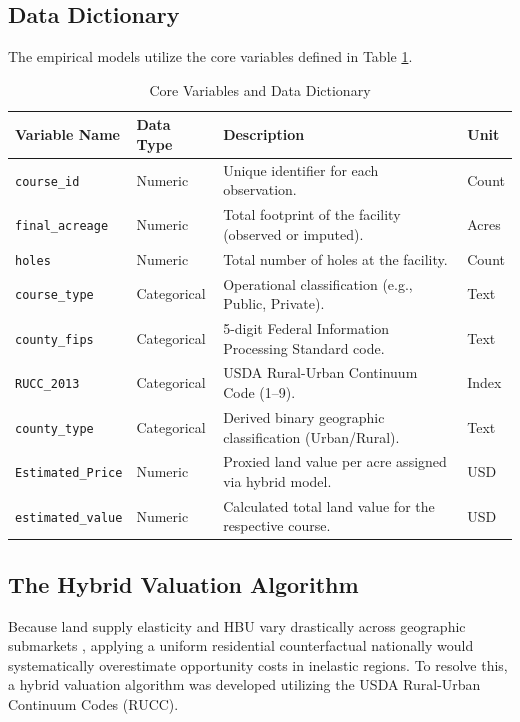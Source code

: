 \documentclass[10pt, letterpaper]{article}
\begin{document}
\subsection{Data Dictionary}
The empirical models utilize the core variables defined in Table \ref{tab:data_dict}.

\begin{table}[h!]
\centering
\caption{Core Variables and Data Dictionary}
\label{tab:data_dict}
\renewcommand{\arraystretch}{1.2}
\begin{tabular}{p{3.5cm} p{2cm} p{7cm} p{2.5cm}}
\hline
\textbf{Variable Name} & \textbf{Data Type} & \textbf{Description} & \textbf{Unit} \\
\hline
\texttt{course\_id} & Numeric & Unique identifier for each observation. & Count \\
\texttt{final\_acreage} & Numeric & Total footprint of the facility (observed or imputed). & Acres \\
\texttt{holes} & Numeric & Total number of holes at the facility. & Count \\
\texttt{course\_type} & Categorical & Operational classification (e.g., Public, Private). & Text \\
\texttt{county\_fips} & Categorical & 5-digit Federal Information Processing Standard code. & Text \\
\texttt{RUCC\_2013} & Categorical & USDA Rural-Urban Continuum Code (1--9). & Index \\
\texttt{county\_type} & Categorical & Derived binary geographic classification (Urban/Rural). & Text \\
\texttt{Estimated\_Price} & Numeric & Proxied land value per acre assigned via hybrid model. & USD \\
\texttt{estimated\_value} & Numeric & Calculated total land value for the respective course. & USD \\
\hline
\end{tabular}
\end{table}

\subsection{The Hybrid Valuation Algorithm}
Because land supply elasticity and HBU vary drastically across geographic submarkets \parencite{Davis2008}, applying a uniform residential counterfactual nationally would systematically overestimate opportunity costs in inelastic regions. To resolve this, a hybrid valuation algorithm was developed utilizing the USDA Rural-Urban Continuum Codes (RUCC).
\end{document}
